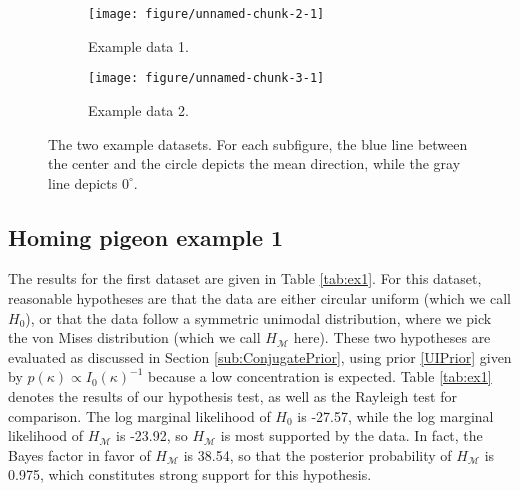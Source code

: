 \begin{figure}
  \begin{subfigure}[t]{0.5\linewidth}\centering
\begin{knitrout}
\color{fgcolor}
\texttt{[image: figure/unnamed-chunk-2-1]} 

\end{knitrout}
    \caption{Example data 1.}\label{fig:ex1a}
  \end{subfigure}%
  \begin{subfigure}[t]{0.5\linewidth}\centering
\begin{knitrout}
\color{fgcolor}
\texttt{[image: figure/unnamed-chunk-3-1]} 

\end{knitrout}
    \caption{Example data 2.}\label{fig:ex1b}
  \end{subfigure}
  \caption{The two example datasets. For each subfigure, the blue line between the center and the circle depicts the mean direction, while the gray line depicts \( 0^\circ\).}\label{fig:ex1}
\end{figure}




\subsection{Homing pigeon example 1}


The results for the first dataset are given in Table \ref{tab:ex1}. For this dataset, reasonable hypotheses are that the data are either circular uniform (which we call \( H_0\)), or that the data follow a symmetric unimodal distribution, where we pick the von Mises distribution (which we call \( H_\mathcal{M} \) here). These two hypotheses are evaluated as discussed in Section \ref{sub:ConjugatePrior}, using prior \ref{UIPrior} given by \( p(\kappa) \propto I_0(\kappa)^{-1}\) because a low concentration is expected. Table \ref{tab:ex1} denotes the results of our hypothesis test, as well as the Rayleigh test for comparison. The log marginal likelihood of \( H_0 \) is -27.57, while the log marginal likelihood of \( H_\mathcal{M} \) is -23.92, so \( H_\mathcal{M} \) is most supported by the data. In fact, the Bayes factor in favor of \( H_\mathcal{M} \) is 38.54, so that the posterior probability of \( H_\mathcal{M} \) is 0.975, which constitutes strong support for this hypothesis.

